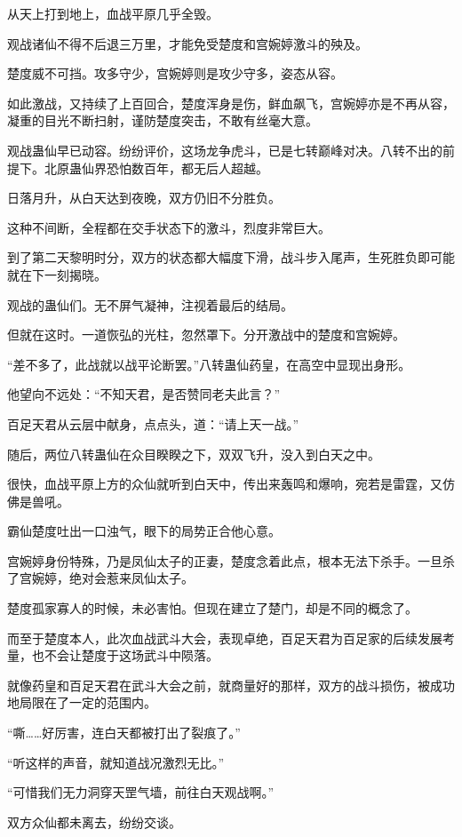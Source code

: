 \begin{this_body}
从天上打到地上，血战平原几乎全毁。

观战诸仙不得不后退三万里，才能免受楚度和宫婉婷激斗的殃及。

楚度威不可挡。攻多守少，宫婉婷则是攻少守多，姿态从容。

如此激战，又持续了上百回合，楚度浑身是伤，鲜血飙飞，宫婉婷亦是不再从容，凝重的目光不断扫射，谨防楚度突击，不敢有丝毫大意。

观战蛊仙早已动容。纷纷评价，这场龙争虎斗，已是七转巅峰对决。八转不出的前提下。北原蛊仙界恐怕数百年，都无后人超越。

日落月升，从白天达到夜晚，双方仍旧不分胜负。

这种不间断，全程都在交手状态下的激斗，烈度非常巨大。

到了第二天黎明时分，双方的状态都大幅度下滑，战斗步入尾声，生死胜负即可能就在下一刻揭晓。

观战的蛊仙们。无不屏气凝神，注视着最后的结局。

但就在这时。一道恢弘的光柱，忽然罩下。分开激战中的楚度和宫婉婷。

“差不多了，此战就以战平论断罢。”八转蛊仙药皇，在高空中显现出身形。

他望向不远处：“不知天君，是否赞同老夫此言？”

百足天君从云层中献身，点点头，道：“请上天一战。”

随后，两位八转蛊仙在众目睽睽之下，双双飞升，没入到白天之中。

很快，血战平原上方的众仙就听到白天中，传出来轰鸣和爆响，宛若是雷霆，又仿佛是兽吼。

霸仙楚度吐出一口浊气，眼下的局势正合他心意。

宫婉婷身份特殊，乃是凤仙太子的正妻，楚度念着此点，根本无法下杀手。一旦杀了宫婉婷，绝对会惹来凤仙太子。

楚度孤家寡人的时候，未必害怕。但现在建立了楚门，却是不同的概念了。

而至于楚度本人，此次血战武斗大会，表现卓绝，百足天君为百足家的后续发展考量，也不会让楚度于这场武斗中陨落。

就像药皇和百足天君在武斗大会之前，就商量好的那样，双方的战斗损伤，被成功地局限在了一定的范围内。

“嘶……好厉害，连白天都被打出了裂痕了。”

“听这样的声音，就知道战况激烈无比。”

“可惜我们无力洞穿天罡气墙，前往白天观战啊。”

双方众仙都未离去，纷纷交谈。


\end{this_body}
